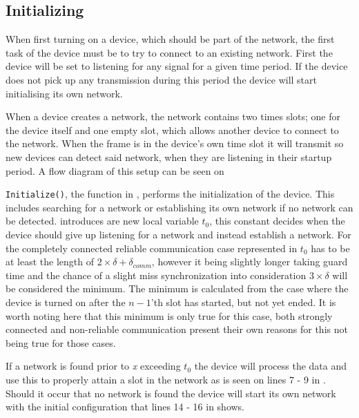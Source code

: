 \subsection{Initializing} %
\label{sub:setupCCRC} 
When first turning on a device, which should be part of the network, the first task of the device must be to try to connect to an existing network.
First the device will be set to listening for any signal for a given time period. 
If the device does not pick up any transmission during this period the device will start initialising its own network.

When a device creates a network, the network contains two times slots; one for the device itself and one empty slot, which allows another device to connect to the network.
When the frame is in the device's own time slot it will transmit so new devices can detect said network, when they are listening in their startup period.  
A flow diagram of this setup can be seen on 

 
\bigskip \noindent
\texttt{Initialize()}, the function in , performs the initialization of the device.
This includes searching for a network or establishing its own network if no network can be detected.
 introduces are new local variable $t_0$, this constant decides when the device should give up listening for a network and instead establish a network.
For the completely connected reliable communication case represented in  $t_0$ has to be at least the length of $2 \times \delta + \delta_{comm}$, however it being slightly longer taking guard time and the chance of a slight miss synchronization into consideration $3 \times \delta$ will be considered the minimum. 
The minimum is calculated from the case where the device is turned on after the $n-1$'th slot has started, but not yet ended.
It is worth noting here that this minimum is only true for this case, both strongly connected and non-reliable communication present their own reasons for this not being true for those cases.

If a network is found prior to \textit{x} exceeding $t_0$ the device will process the data and use this to properly attain a slot in the network as is seen on lines 7 - 9 in .
Should it occur that no network is found the device will start its own network with the initial configuration that lines 14 - 16 in  shows.

